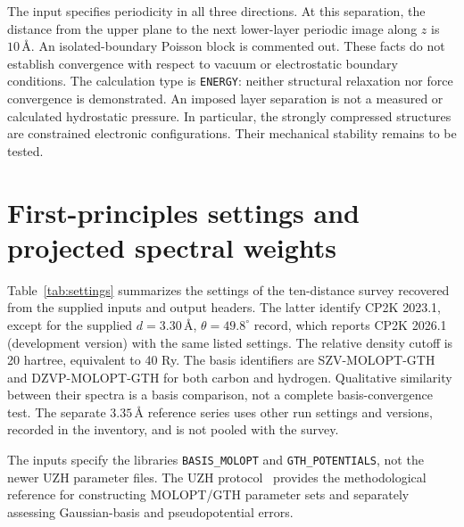 \documentclass[aps,prl,10pt,onecolumn,superscriptaddress,longbibliography]{revtex4-2}
\newcommand{\angstrom}{\text{\AA}}
\begin{document}
The input specifies periodicity in all three directions. At this separation, the distance from the upper plane to the next lower-layer periodic image along $z$ is $10\,\angstrom$. An isolated-boundary Poisson block is commented out. These facts do not establish convergence with respect to vacuum or electrostatic boundary conditions. The calculation type is \texttt{ENERGY}: neither structural relaxation nor force convergence is demonstrated. An imposed layer separation is not a measured or calculated hydrostatic pressure. In particular, the strongly compressed structures are constrained electronic configurations. Their mechanical stability remains to be tested.

\section{First-principles settings and projected spectral weights}

Table~\ref{tab:settings} summarizes the settings of the ten-distance survey recovered from the supplied inputs and output headers. The latter identify CP2K 2023.1, except for the supplied $d=3.30\,\angstrom$, $\theta=49.8^\circ$ record, which reports CP2K 2026.1 (development version) with the same listed settings. The relative density cutoff is 20 hartree, equivalent to 40 Ry. The basis identifiers are SZV-MOLOPT-GTH and DZVP-MOLOPT-GTH for both carbon and hydrogen. Qualitative similarity between their spectra is a basis comparison, not a complete basis-convergence test. The separate $3.35\,\angstrom$ reference series uses other run settings and versions, recorded in the inventory, and is not pooled with the survey.

The inputs specify the libraries \texttt{BASIS\_MOLOPT} and \texttt{GTH\_POTENTIALS}, not the newer UZH parameter files. The UZH protocol~\cite{uzh2026} provides the methodological reference for constructing MOLOPT/GTH parameter sets and separately assessing Gaussian-basis and pseudopotential errors.
\end{document}
